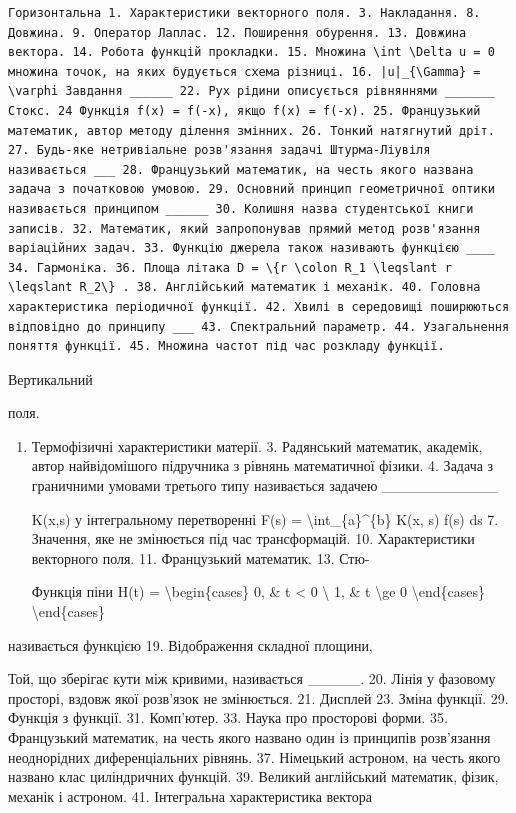 \documentclass[
]{article}
\begin{document}
{\begin{verbatim}
Горизонтальна 1. Характеристики векторного поля. 3. Накладання. 8. Довжина. 9. Оператор Лаплас. 12. Поширення обурення. 13. Довжина вектора. 14. Робота функцій прокладки. 15. Множина \int \Delta u = 0 множина точок, на яких будується схема різниці. 16. |u|_{\Gamma} = \varphi Завдання ______ 22. Рух рідини описується рівняннями _______ Стокс. 24 Функція f(x) = f(-x), якщо f(x) = f(-x). 25. Французький математик, автор методу ділення змінних. 26. Тонкий натягнутий дріт. 27. Будь-яке нетривіальне розв'язання задачі Штурма-Ліувіля називається ___ 28. Французький математик, на честь якого названа задача з початковою умовою. 29. Основний принцип геометричної оптики називається принципом ______ 30. Колишня назва студентської книги записів. 32. Математик, який запропонував прямий метод розв'язання варіаційних задач. 33. Функцію джерела також називають функцією ____ 34. Гармоніка. 36. Площа літака D = \{r \colon R_1 \leqslant r \leqslant R_2\} . 38. Англійський математик і механік. 40. Головна характеристика періодичної функції. 42. Хвилі в середовищі поширюються відповідно до принципу ___ 43. Спектральний параметр. 44. Узагальнення поняття функції. 45. Множина частот під час розкладу функції.
\end{verbatim}

Вертикальний

поля.

\begin{enumerate}
\def\labelenumi{\arabic{enumi}.}
\setcounter{enumi}{1}
\item
  Термофізичні характеристики матерії. 3. Радянський математик,
  академік, автор найвідомішого підручника з рівнянь математичної
  фізики. 4. Задача з граничними умовами третього типу називається
  задачею \_\_\_\_\_\_\_\_\_\_\_

  K(x,s) у інтегральному перетворенні F(s) =
  \textbackslash int\_\{a\}\^{}\{b\} K(x, s) f(s) ds 7. Значення, яке не
  змінюється під час трансформацій. 10. Характеристики векторного поля.
  11. Французький математик. 13. Стю-

  Функція піни H(t) = \textbackslash begin\{cases\} 0, \& t \textless{}
  0 \textbackslash{} 1, \& t \textbackslash ge 0
  \textbackslash end\{cases\} \textbackslash end\{cases\}
\end{enumerate}

називається функцією 19. Відображення складної площини,

Той, що зберігає кути між кривими, називається \_\_\_\_\_. 20. Лінія у
фазовому просторі, вздовж якої розв'язок не змінюється. 21. Дисплей 23.
Зміна функції. 29. Функція з функції. 31. Комп'ютер. 33. Наука про
просторові форми. 35. Французький математик, на честь якого названо один
із принципів розв'язання неоднорідних диференціальних рівнянь. 37.
Німецький астроном, на честь якого названо клас циліндричних функцій.
39. Великий англійський математик, фізик, механік і астроном. 41.
Інтегральна характеристика вектора

}
\end{document}
